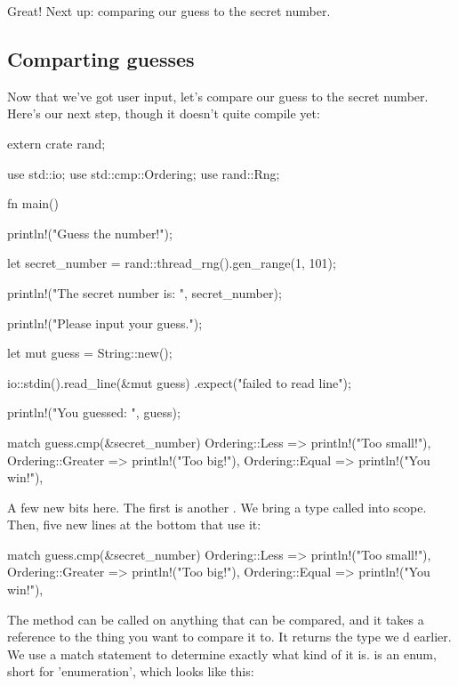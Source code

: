 Great! Next up: comparing our guess to the secret number.

\subsection{Comparting guesses}

Now that we've got user input, let's compare our guess to the secret number. Here's our next step, though it doesn't quite 
compile yet:

\begin{rustc}
extern crate rand;

use std::io;
use std::cmp::Ordering;
use rand::Rng;

fn main() {
    println!("Guess the number!");

    let secret_number = rand::thread_rng().gen_range(1, 101);

    println!("The secret number is: {}", secret_number);

    println!("Please input your guess.");

    let mut guess = String::new();

    io::stdin().read_line(&mut guess)
        .expect("failed to read line");

    println!("You guessed: {}", guess);

    match guess.cmp(&secret_number) {
        Ordering::Less    => println!("Too small!"),
        Ordering::Greater => println!("Too big!"),
        Ordering::Equal   => println!("You win!"),
    }
}
\end{rustc}

A few new bits here. The first is another . We bring a type called  into scope. Then, five 
new lines at the bottom that use it:

\begin{rustc}
match guess.cmp(&secret_number) {
    Ordering::Less    => println!("Too small!"),
    Ordering::Greater => println!("Too big!"),
    Ordering::Equal   => println!("You win!"),
}
\end{rustc}

The  method can be called on anything that can be compared, and it takes a reference to the thing you want to compare 
it to. It returns the  type we d earlier. We use a match statement to determine exactly what kind of 
 it is.  is an enum, short for 'enumeration', which looks like this:

